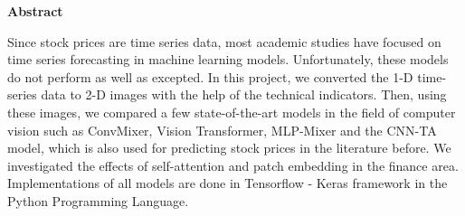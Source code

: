 \documentclass{article}
\begin{document}
\tableofcontents

\maketitle
\begin{center}
    \textbf{\Large Abstract}
\end{center}
Since stock prices are time series data, most academic studies have focused on time series forecasting in machine learning models. Unfortunately, these models do not perform as well as excepted. In this project, we converted the 1-D time-series data to 2-D images with the help of the technical indicators. Then, using these images, we compared a few state-of-the-art models in the field of computer vision such as ConvMixer, Vision Transformer, MLP-Mixer and the CNN-TA model, which is also used for predicting stock prices in the literature before. We investigated the effects of self-attention and patch embedding in the finance area. Implementations of all models are done in Tensorflow - Keras framework in the Python Programming Language.
\end{document}

